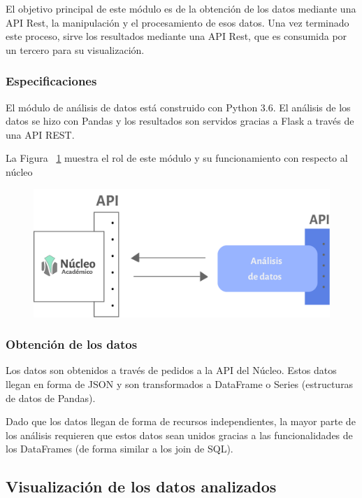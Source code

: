 El objetivo principal de este módulo es de la obtención de los datos mediante una API Rest, la manipulación y el procesamiento de esos datos. Una vez terminado este proceso, sirve los resultados mediante una API Rest, que es consumida por un tercero para su visualización.

\subsubsection{Especificaciones}

El módulo de análisis de datos está construido con Python 3.6. El análisis de los datos se hizo con Pandas y los resultados son servidos gracias a Flask a través de una API REST.


La Figura ~\ref{fig:analisis-nucleo} muestra el rol de este módulo y su funcionamiento con respecto al núcleo

\begin{figure}[h!]
  \centering
    \includegraphics[scale=0.8]{images/analisis-datos/analisis-datos.png}
  \label{fig:analisis-nucleo}
\end{figure}


\subsubsection{Obtención de los datos}

Los datos son obtenidos a través de pedidos a la API del Núcleo. Estos datos llegan en forma de JSON y son transformados a DataFrame o Series (estructuras de datos de Pandas). 

Dado que los datos llegan de forma de recursos independientes, la mayor parte de los análisis requieren que estos datos sean unidos gracias a las funcionalidades de los DataFrames (de forma similar a los join de SQL).

\subsection[Visualización de los datos analizados]{Visualización de los datos analizados}


